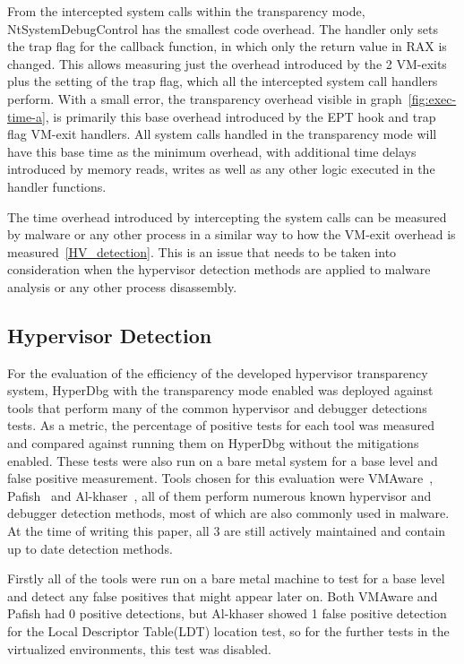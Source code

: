 From the intercepted system calls within the transparency mode, NtSystemDebugControl has the smallest code overhead. 
The handler only sets the trap flag for the callback function, in which only the return value in RAX is changed. 
This allows measuring just the overhead introduced by the 2 VM-exits plus the setting of the trap flag, which all the intercepted system call handlers perform. 
With a small error, the transparency overhead visible in graph~\ref{fig:exec-time-a}, is primarily this base overhead introduced by the EPT hook and trap flag VM-exit handlers. 
All system calls handled in the transparency mode will have this base time as the minimum overhead, with additional time delays introduced by memory reads, writes 
as well as any other logic executed in the handler functions.

The time overhead introduced by intercepting the system calls can be measured by malware or any other process in a similar way to how the VM-exit overhead is measured~\ref{HV_detection}. 
This is an issue that needs to be taken into consideration when the hypervisor detection methods are applied to malware analysis or any other process disassembly.

\subsection{Hypervisor Detection}\label{HV-detection-eval}
For the evaluation of the efficiency of the developed hypervisor transparency system, HyperDbg with the transparency mode enabled was deployed against tools that perform many of 
the common hypervisor and debugger detections tests. As a metric, the percentage of positive tests for each tool was measured and compared against running them on HyperDbg 
without the mitigations enabled. These tests were also run on a bare metal system for a base level and false positive measurement. 
Tools chosen for this evaluation were VMAware~\cite{vmaware}, Pafish~\cite{pafish} and Al-khaser~\cite{al-khaser}, all of them perform numerous known hypervisor and debugger detection methods, 
most of which are also commonly used in malware. At the time of writing this paper, all 3 are still actively maintained and contain up to date detection methods.

Firstly all of the tools were run on a bare metal machine to test for a base level and detect any false positives that might appear later on. 
Both VMAware and Pafish had 0 positive detections, but Al-khaser showed 1 false positive detection for the Local Descriptor Table(LDT) location test, 
so for the further tests in the virtualized environments, this test was disabled.

